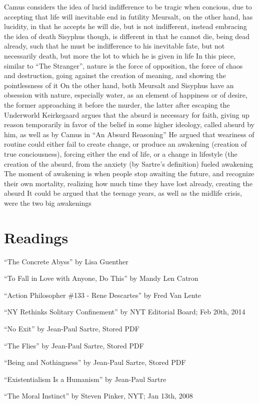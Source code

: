 \documentclass[11 pt, twoside]{article}
\newenvironment{outline*}
{
	\begin{outline}[enumerate]
	}
	{\end{outline}
}
\begin{document}
\begin{outline*}
\3 Camus considers the idea of lucid indifference to be tragic when concious, due to accepting that life will inevitable end in futility
\3 Meursalt, on the other hand, has lucidity, in that he accepts he will die, but is not indifferent, instead embracing the idea of death
\3 Sisyphus though, is different in that he cannot die, being dead already, such that he must be indifference to his inevitable fate, but not necessarily death, but more the lot to which he is given in life
\2 In this piece, similar to ``The Stranger'', nature is the force of opposition, the force of chaos and destruction, going against the creation of meaning, and showing the pointlessness of it
\3 On the other hand, both Meursalt and Sisyphus have an obsession with nature, especially water, as an element of happiness or of desire, the former approaching it before the murder, the latter after escaping the Underworld
\1 Keirkegaard argues that the absurd is necessary for faith, giving up reason temporarily in favor of the belief in some higher ideology, called absurd by him, as well as by Camus in ``An Absurd Reasoning''
\2 He argued that weariness of routine could either fail to create change, or produce an awakening (creation of true conciousness), forcing either the end of life, or a change in lifestyle (the creation of the absurd, from the anxiety (by Sartre's definition) fueled awakening
\3 The moment of awakening is when people stop awaiting the future, and recognize their own mortality, realizing how much time they have lost already, creating the absurd
\3 It could be argued that the teenage years, as well as the midlife crisis, were the two big awakenings
\1 
\end{outline*}
\section{Readings}
\begin{enumerate}
\hypertarget{1}{\item ``The Concrete Abyss'' by Lisa Guenther}
\hypertarget{2}{\item ``To Fall in Love with Anyone, Do This'' by Mandy Len Catron}
\hypertarget{3}{\item ``Action Philosopher \#133 - Rene Descartes'' by Fred Van Lente}
\hypertarget{4}{\item ``NY Rethinks Solitary Confinement'' by NYT Editorial Board; Feb 20th, 2014}
\hypertarget{5}{\item ``No Exit'' by Jean-Paul Sartre, Stored PDF}
\hypertarget{6}{\item ``The Flies'' by Jean-Paul Sartre, Stored PDF}
\hypertarget{7}{\item ``Being and Nothingness'' by Jean-Paul Sartre, Stored PDF}
\hypertarget{8}{\item ``Existentialism Is a Humanism'' by Jean-Paul Sartre}
\hypertarget{9}{\item ``The Moral Instinct'' by Steven Pinker, NYT; Jan 13th, 2008}
\end{enumerate}
\end{document}
